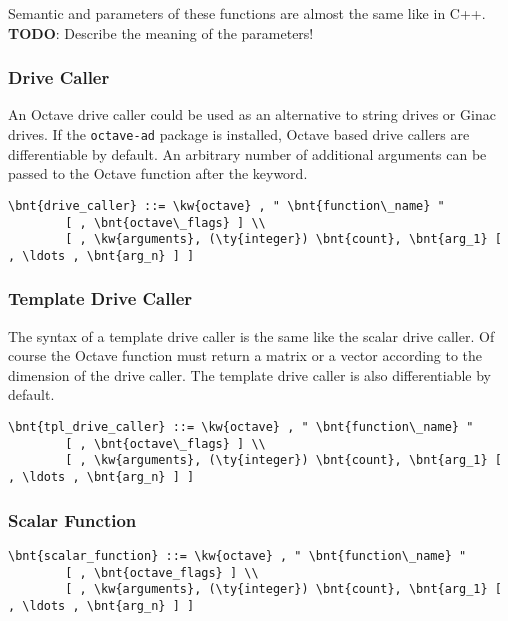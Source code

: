 Semantic and parameters of these functions are almost the same like in C++. \\
\textbf{TODO}: Describe the meaning of the parameters!

\subsubsection{Drive Caller}
An Octave drive caller could be used as an alternative to string drives or Ginac drives. 
If the \texttt{octave-ad} package is installed, Octave based drive callers are differentiable by default.
An arbitrary number of additional arguments can be passed to the Octave function  after the  keyword.
\begin{Verbatim}[commandchars=\\\{\}]
    \bnt{drive_caller} ::= \kw{octave} , " \bnt{function\_name} "
        [ , \bnt{octave\_flags} ] \\
        [ , \kw{arguments}, (\ty{integer}) \bnt{count}, \bnt{arg_1} [ , \ldots , \bnt{arg_n} ] ]
\end{Verbatim}

\subsubsection{Template Drive Caller}
The syntax of a template drive caller is the same like the scalar drive caller. Of course the Octave function must return a matrix or a vector according to the dimension of the drive caller. The template drive caller is also differentiable by default.
\begin{Verbatim}[commandchars=\\\{\}]
    \bnt{tpl_drive_caller} ::= \kw{octave} , " \bnt{function\_name} "
        [ , \bnt{octave\_flags} ] \\
        [ , \kw{arguments}, (\ty{integer}) \bnt{count}, \bnt{arg_1} [ , \ldots , \bnt{arg_n} ] ]
\end{Verbatim}

\subsubsection{Scalar Function}
\begin{Verbatim}[commandchars=\\\{\}]
    \bnt{scalar_function} ::= \kw{octave} , " \bnt{function\_name} "
        [ , \bnt{octave_flags} ] \\
        [ , \kw{arguments}, (\ty{integer}) \bnt{count}, \bnt{arg_1} [ , \ldots , \bnt{arg_n} ] ]
\end{Verbatim}

